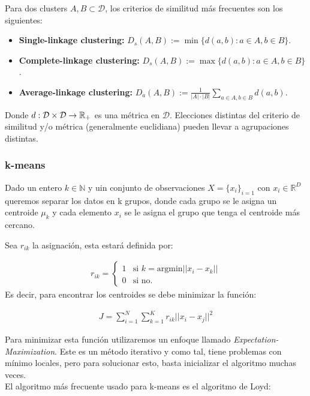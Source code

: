 Para dos clusters $A,B\subset\mathcal{D}$, los criterios de similitud más frecuentes son los siguientes:

\begin{itemize}
	\item \textbf{Single-linkage clustering:} $D_s(A,B):=\min\{d(a,b):a\in A, b\in B\}$.
	\item \textbf{Complete-linkage clustering:} $D_s(A,B):=\max\{d(a,b):a\in A, b\in B\}$.
	\item \textbf{Average-linkage clustering:} $D_a(A,B):=\frac{1}{|A|\cdot|B|}\sum_{a\in A, b\in B} d(a,b)$.
\end{itemize}

Donde $d:\mathcal{D}\times \mathcal{D}\to \mathbb{R}_+$ es una métrica en $\mathcal{D}$. Elecciones distintas del criterio de similitud y/o métrica (generalmente euclidiana) pueden llevar a agrupaciones distintas.

\subsubsection{k-means}
Dado un entero $k \in \mathbb{N}$ y uin conjunto de observaciones $X = \{x_i\}_{i=1}$ con $x_i\in \mathbb{R}^D$ queremos separar los datos en k grupos, donde cada grupo se le asigna un centroide $\mu_k$ y cada elemento $x_i$ se le asigna el grupo que tenga el centroide más cercano.

Sea $r_{ik}$ la asignación, esta estará definida por:

\begin{align}
r_{ik} = \begin{cases}
1 & \text{si } k = \text{argmin}||x_i-x_k||\\
0 & \text{si no.}
\end{cases}
\end{align}
Es decir, para encontrar los centroides se debe minimizar la función:

\begin{align}
J = \sum_{i=1}^N \sum_{k=1}^K r_{ik} ||x_i-x_j||^2
\end{align}

Para minimizar esta función utilizaremos un enfoque llamado \emph{Expectation-Maximization}. Este es un método iterativo y como tal, tiene problemas con mínimo locales, pero para solucionar esto, basta inicializar el algoritmo muchas veces.\\

El algoritmo más frecuente usado para k-means es el algoritmo de Loyd:

